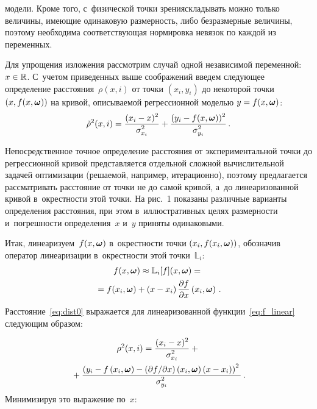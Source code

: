 \begin{multicols}{2}
\vspace*{12pt}

\addtocounter{figure}{1}



\noindent
 модели.
Кроме того, с~физической точки зрения\linebreak складывать
можно только величины, име\-ющие одинаковую раз\-мер\-ность, либо безразмерные
величины, поэтому необходима соответствующая нормировка невязок по каждой
из переменных.

Для упрощения изложения рассмотрим случай одной независимой переменной:
$x \hm\in \mathbb{R}$. С~учетом приведенных выше соображений введем
сле\-ду\-ющее определение расстояния~$\rho(x, i)$
от точки $(x_i, y_i)$ до некоторой точ\-ки
$(x, f(x, \boldsymbol{\omega}))$ на кривой, описываемой регрессионной моделью $y \hm= f(x, 
\bomega)$:
\begin{equation}
  \tilde{\rho}^2(x, i) = \displaystyle\frac{\displaystyle (x_i - x)^2\mathstrut}{\displaystyle \sigma_{x_i}^2\mathstrut} + \displaystyle\frac{\displaystyle (y_i - f(x, 
\boldsymbol{\omega}))^2\mathstrut}{\displaystyle \sigma_{y_i}^2\mathstrut}\,.
  \label{eq:dist0}
\end{equation}



Непосредственное точное определение расстояния от экспериментальной
точки до регрессионной кривой представляется отдельной
сложной вы\-чис\-ли\-тель\-ной задачей
оптимизации (решаемой, например, итерационно),
поэтому предлагается рассматривать
расстояние от точки не до самой кривой, а~до
линеаризованной кривой в~окрестности этой точки. На рис.~1
показаны различные варианты определения рас\-сто\-яния, при этом
в~иллюстративных целях раз\-мер\-ности и~по\-греш\-ности определения~$x$ и~$y$ приняты
одинаковыми.

Итак, линеаризуем~$f(x, \boldsymbol{\omega})$ в~окрестности точки $(x_i, f(x_i, \boldsymbol{\omega}))$,
обозначив оператор линеаризации в~окрестности этой точки~$\mathbb{L}_i$:
\begin{multline}
  f(x, \boldsymbol{\omega}) \approx \mathbb{L}_{i}[f](x, \boldsymbol{\omega}) = {}\\
  {}=f(x_i, \boldsymbol{\omega}) + \left(x - 
x_i\right) \displaystyle\frac{\displaystyle \partial f\mathstrut}{\displaystyle \partial x\mathstrut}\left(x_i, \boldsymbol{\omega}\right)\,.
  \label{eq:f_linear}
\end{multline}
Расстояние~\eqref{eq:dist0} выражается для линеаризованной функции~\eqref{eq:f_linear} 
сле\-ду\-ющим образом:

\noindent
\begin{multline*}
  \rho^2(x, i) = \displaystyle\frac{\displaystyle (x_i - x)^2\mathstrut}{\displaystyle \sigma_{x_i}^2\mathstrut} +{}\\
  {}+ \displaystyle\frac{\displaystyle \left(y_i - f\left(x_i, 
\boldsymbol{\omega}\right) - ({\partial f}/{\partial x})\left(x_i, \boldsymbol{\omega}\right) \left(x - 
x_i\right)\right)^2\mathstrut}{\displaystyle \sigma_{y_i}^2\mathstrut}\,.
\end{multline*}
Минимизируя это выражение по~$x$:


\end{multicols}
